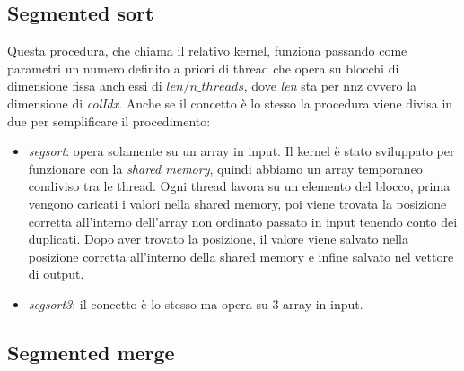 \documentclass[]{IEEEtran}
\begin{document}
	\subsection{Segmented sort}
	\label{seg-sort}
	Questa procedura, che chiama il relativo kernel, funziona passando come parametri un numero definito a priori di thread che opera su blocchi di dimensione fissa anch'essi di $ len/n\_threads $, dove \textit{len} sta per nnz ovvero la dimensione di \textit{colIdx}.\newline
	Anche se il concetto è lo stesso la procedura viene divisa in due per semplificare il procedimento:
	\begin{itemize}
		\item \textit{segsort}: opera solamente su un array in input. Il kernel è stato sviluppato per funzionare con la \textit{shared memory}, quindi abbiamo un array temporaneo condiviso tra le thread. Ogni thread lavora su un elemento del blocco, prima vengono caricati i valori nella shared memory, poi viene trovata la posizione corretta all'interno dell'array non ordinato passato in input tenendo conto dei duplicati. Dopo aver trovato la posizione, il valore viene salvato nella posizione corretta all'interno della shared memory e infine salvato nel vettore di output.
		\item \textit{segsort3}: il concetto è lo stesso ma opera su 3 array in input.
	\end{itemize}
	
	
	\subsection{Segmented merge}
	\label{seg-merge}
\end{document}
